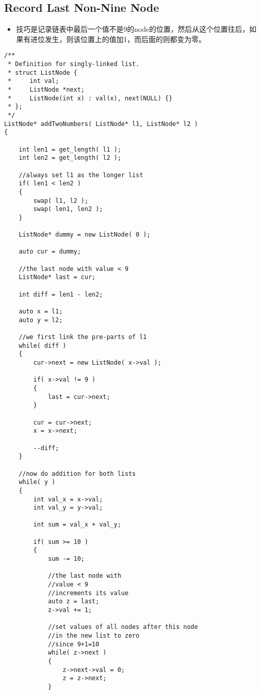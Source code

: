 \subsection{Record Last Non-Nine Node}
\begin{itemize}
\item 技巧是记录链表中最后一个值不是9的node的位置，然后从这个位置往后，如果有进位发生，则该位置上的值加1，而后面的则都变为零。
\end{itemize}


\setcounter{lstlisting}{0}
\begin{lstlisting}[style=customc, caption={Record Last Non-Nine Node}]
/**
 * Definition for singly-linked list.
 * struct ListNode {
 *     int val;
 *     ListNode *next;
 *     ListNode(int x) : val(x), next(NULL) {}
 * };
 */
ListNode* addTwoNumbers( ListNode* l1, ListNode* l2 )
{

    int len1 = get_length( l1 );
    int len2 = get_length( l2 );

    //always set l1 as the longer list
    if( len1 < len2 )
    {
        swap( l1, l2 );
        swap( len1, len2 );
    }

    ListNode* dummy = new ListNode( 0 );

    auto cur = dummy;

    //the last node with value < 9
    ListNode* last = cur;

    int diff = len1 - len2;

    auto x = l1;
    auto y = l2;

    //we first link the pre-parts of l1
    while( diff )
    {
        cur->next = new ListNode( x->val );

        if( x->val != 9 )
        {
            last = cur->next;
        }

        cur = cur->next;
        x = x->next;

        --diff;
    }

    //now do addition for both lists
    while( y )
    {
        int val_x = x->val;
        int val_y = y->val;

        int sum = val_x + val_y;

        if( sum >= 10 )
        {
            sum -= 10;

            //the last node with
            //value < 9
            //increments its value
            auto z = last;
            z->val += 1;

            //set values of all nodes after this node
            //in the new list to zero
            //since 9+1=10
            while( z->next )
            {
                z->next->val = 0;
                z = z->next;
            }


\end{lstlisting}
